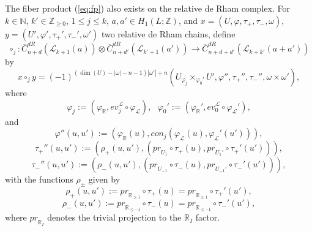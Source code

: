 \documentclass[a4paper]{article}
\numberwithin{equation}{section}
\begin{document}
The fiber product (\ref{eq:fp}) also exists on the relative de Rham complex. For $k\in\mathbb{N}$, $k'\in\mathbb{Z}_{\geq0}$, $1\leq j\leq k$, $a,a'\in H_1(L;\mathbb{Z})$, and $x=(U,\varphi,\tau_+,\tau_-,\omega)$, $y=(U',\varphi',\tau_+',\tau_-',\omega')$ two relative de Rham chains, define
\begin{equation}\label{eq:fpr}
\circ_j:\overline{C}_{n+d}^\mathit{dR}(\mathcal{L}_{k+1}(a))\otimes\overline{C}^\mathit{dR}_{n+d'}(\mathcal{L}_{k'+1}(a'))\rightarrow\overline{C}^\mathit{dR}_{n+d+d'}(\mathcal{L}_{k+k'}(a+a'))
\end{equation}
by
\begin{equation}
x\circ_jy=(-1)^{(\dim(U)-|\omega|-n-1)|\omega'|+n}\left(U_{\varphi_j}\times_{\varphi_0'}U',\varphi'',\tau_+'',\tau_-'',\omega\times\omega'\right),
\end{equation}
where
\begin{equation}
\varphi_j:=(\varphi_\mathbb{R},\mathit{ev}_j^\mathcal{L}\circ\varphi_\mathcal{L}),\textrm{ }\varphi_0':=(\varphi_\mathbb{R}',\mathit{ev}_0^\mathcal{L}\circ\varphi_\mathcal{L}'),
\end{equation}
and
\begin{equation}
\varphi''(u,u'):=\left(\varphi_\mathbb{R}(u),\mathit{con}_j(\varphi_\mathcal{L}(u),\varphi_\mathcal{L}'(u'))\right),
\end{equation}
\begin{equation}
\tau_+''(u,u'):=\left(\rho_+(u,u'),(\mathit{pr}_{U_1}\circ\tau_+(u),\mathit{pr}_{U_1'}\circ\tau_+'(u'))\right),
\end{equation}
\begin{equation}
\tau_-''(u,u'):=\left(\rho_-(u,u'),(\mathit{pr}_{U_{-1}}\circ\tau_-(u),\mathit{pr}_{U_{-1}'}\circ\tau_-'(u'))\right),
\end{equation}
with the functions $\rho_\pm$ given by
\begin{equation}
\rho_+(u,u'):=\mathit{pr}_{\mathbb{R}_{\geq1}}\circ\tau_+(u)=\mathit{pr}_{\mathbb{R}_{\geq1}}\circ\tau_+'(u'),
\end{equation}
\begin{equation}
\rho_-(u,u'):=\mathit{pr}_{\mathbb{R}_{\leq-1}}\circ\tau_-(u)=\mathit{pr}_{\mathbb{R}_{\leq-1}}\circ\tau_-'(u'),
\end{equation}
where $\mathit{pr}_{\mathbb{R}_I}$ denotes the trivial projection to the $\mathbb{R}_I$ factor.
\end{document}

